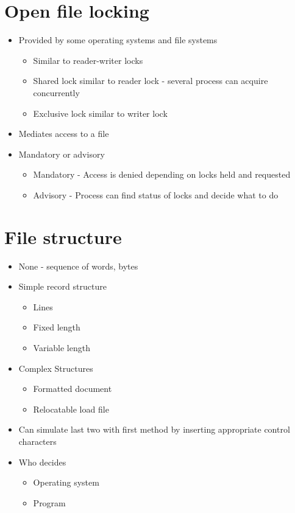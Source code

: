 \documentclass{article}[18pt]
\begin{document}
\section{Open file locking}
\begin{itemize}
	\item Provided by some operating systems and file systems
	\begin{itemize}
		\item Similar to reader-writer locks
		\item Shared lock similar to reader lock - several process can acquire concurrently
		\item Exclusive lock similar to writer lock
	\end{itemize}
	\item Mediates access to a file
	\item Mandatory or advisory
	\begin{itemize}
		\item Mandatory - Access is denied depending on locks held and requested
		\item Advisory - Process can find status of locks and decide what to do
	\end{itemize}
\end{itemize}
\section{File structure}
\begin{itemize}
	\item None - sequence of words, bytes
	\item Simple record structure
	\begin{itemize}
		\item Lines
		\item Fixed length
		\item Variable length
	\end{itemize}
	\item Complex Structures
	\begin{itemize}
		\item Formatted document
		\item Relocatable load file
	\end{itemize}
	\item Can simulate last two with first method by inserting appropriate control characters
	\item Who decides
	\begin{itemize}
		\item Operating system
		\item Program
	\end{itemize}
\end{itemize}
\end{document}
